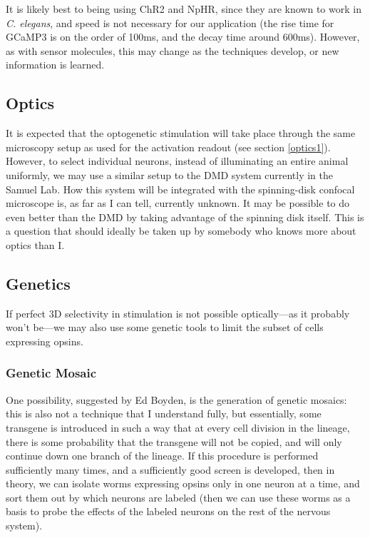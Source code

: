 \documentclass[letter,11pt]{article}
\newcommand{\cel}{{\em C. elegans}}
\begin{document}
It is likely best to being using ChR2 and NpHR, since they are known to work in \cel , and speed
is not necessary for our application (the rise time for GCaMP3 is on the order of 100ms, and the
decay time around 600ms). However, as with sensor molecules, this may change as the techniques
develop, or new information is learned.

\subsection{Optics}

It is expected that the optogenetic stimulation will take place through the
same microscopy setup as used for the activation readout (see section
\ref{optics1}). However, to select individual neurons, instead of illuminating
an entire animal uniformly, we may use a similar setup to the DMD system
currently in the Samuel Lab. How this system will be integrated with the
spinning-disk confocal microscope is, as far as I can tell, currently unknown.
It may be possible to do even better than the DMD by taking advantage of the
spinning disk itself. This is a question that should ideally be taken up by
somebody who knows more about optics than I.

\subsection{Genetics}
\label{genetics}

If perfect 3D selectivity in stimulation is not possible optically---as it
probably won't be---we may also use some genetic tools to limit the subset
of cells expressing opsins.

\subsubsection{Genetic Mosaic}

One possibility, suggested by Ed Boyden, is the generation of genetic mosaics:
this is also not a technique that I understand fully, but essentially, some
transgene is introduced in such a way that at every cell division in the lineage,
there is some probability that the transgene will not be copied, and will only
continue down one branch of the lineage. If this procedure is performed sufficiently
many times, and a sufficiently good screen is developed, then in theory, we can
isolate worms expressing opsins only in one neuron at a time, and sort them out
by which neurons are labeled (then we can use these worms as a basis to probe the
effects of the labeled neurons on the rest of the nervous system).
\end{document}
